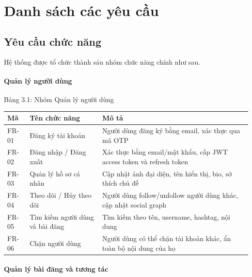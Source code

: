 \section{Danh sách các yêu
cầu}\label{danh-suxe1ch-cuxe1c-yuxeau-cux1ea7u}

\subsection{Yêu cầu chức
năng}\label{yuxeau-cux1ea7u-chux1ee9c-nux103ng}

Hệ thống được tổ chức thành sáu nhóm chức năng chính như sau.

\paragraph{Quản lý người
dùng}\label{quux1ea3n-luxfd-ngux1b0ux1eddi-duxf9ng}

Bảng 3.1: Nhóm Quản lý người dùng

{\def\LTcaptype{none} %
\begin{longtable}{
  |>{\centering\arraybackslash}p{}
  |>{\centering\arraybackslash}p{}
  |>{\centering\arraybackslash}p{}|}
\endhead
\hline
\endlastfoot
Mã & Tên chức năng & Mô tả \\ \hline
FR-01 & Đăng ký tài khoản & Người dùng đăng ký bằng email, xác thực qua
mã OTP \\ \hline
FR-02 & Đăng nhập / Đăng xuất & Xác thực bằng email/mật khẩu, cấp JWT
access token và refresh token \\ \hline
FR-03 & Quản lý hồ sơ cá nhân & Cập nhật ảnh đại diện, tên hiển thị,
bio, sở thích chủ đề \\ \hline
FR-04 & Theo dõi / Hủy theo dõi & Người dùng follow/unfollow người dùng
khác, cập nhật social graph \\ \hline
FR-05 & Tìm kiếm người dùng và bài đăng & Tìm kiếm theo tên, username,
hashtag, nội dung \\ \hline
FR-06 & Chặn người dùng & Người dùng có thể chặn tài khoản khác, ẩn toàn
bộ nội dung của họ \\ \hline
\end{longtable}
}

\paragraph{Quản lý bài đăng và tương
tác}\label{quux1ea3n-luxfd-buxe0i-ux111ux103ng-vuxe0-tux1b0ux1a1ng-tuxe1c}

